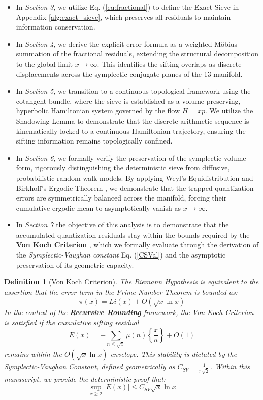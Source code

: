 \documentclass[sn-mathphys-num, pdflatex]{sn-jnl}
\newtheorem{definition}[theorem]{Definition}
\begin{document}
\begin{itemize}
    \item In \textit{Section 3}, we utilize Eq. (\ref{eq:fractional}) to define the Exact Sieve in Appendix \ref{alg:exact_sieve}, which preserves all residuals to maintain information conservation.
    \item In \textit{Section 4}, we derive the explicit error formula as a weighted M\"{o}bius summation of the fractional residuals, extending the structural decomposition to the global limit $x \to \infty$. This identifies the sifting overlaps as discrete displacements across the symplectic conjugate planes of the 13-manifold.
    \item In \textit{Section 5}, we transition to a continuous topological framework using the cotangent bundle, where the sieve is established as a volume-preserving, hyperbolic Hamiltonian system governed by the flow $H=xp$. We utilize the Shadowing Lemma to demonstrate that the discrete arithmetic sequence is kinematically locked to a continuous Hamiltonian trajectory, ensuring the sifting information remains topologically confined.
    \item In \textit{Section 6}, we formally verify the preservation of the symplectic volume form, rigorously distinguishing the deterministic sieve from diffusive, probabilistic random-walk models. By applying Weyl’s Equidistribution \cite{weyl} and Birkhoff’s Ergodic Theorem \cite{birkhoff1931proof}, we demonstrate that the trapped quantization errors are symmetrically balanced across the manifold, forcing their cumulative ergodic mean to asymptotically vanish as $x \to \infty$.
    \item In \textit{Section 7} the objective of this analysis is to demonstrate that the accumulated quantization residuals stay within the bounds required by the \textbf{Von Koch Criterion} \cite{vonkoch}, which we formally evaluate  through the derivation of the \textit{Symplectic-Vaughan constant} Eq. (\ref{CSVal}) and the asymptotic preservation of its geometric capacity.
\end{itemize}
\begin{definition}[Von Koch Criterion]
The Riemann Hypothesis is equivalent to the assertion that the error term in the Prime Number Theorem is bounded as: 
\begin{equation}
    \pi(x) = Li(x) + O(\sqrt{x} \ln x)
\end{equation}
In the context of the \textbf{Recursive Rounding} framework, the Von Koch Criterion is satisfied if the cumulative sifting residual 
\begin{equation}
    E(x) = - \sum_{n \le \sqrt{x}} \mu(n) \left\{ \frac{x}{n} \right\} + O(1)
\end{equation}
remains within the $O(\sqrt{x} \ln x)$ envelope. This stability is dictated by the \textit{Symplectic-Vaughan Constant}, defined geometrically as $C_{SV} = \frac{1}{\pi\sqrt{2}}$. Within this manuscript, we provide the deterministic proof that:
\begin{equation}
    \sup_{x \ge 2} |E(x)| \le C_{SV} \sqrt{x} \ln x
\end{equation}
\end{definition}
\end{document}

